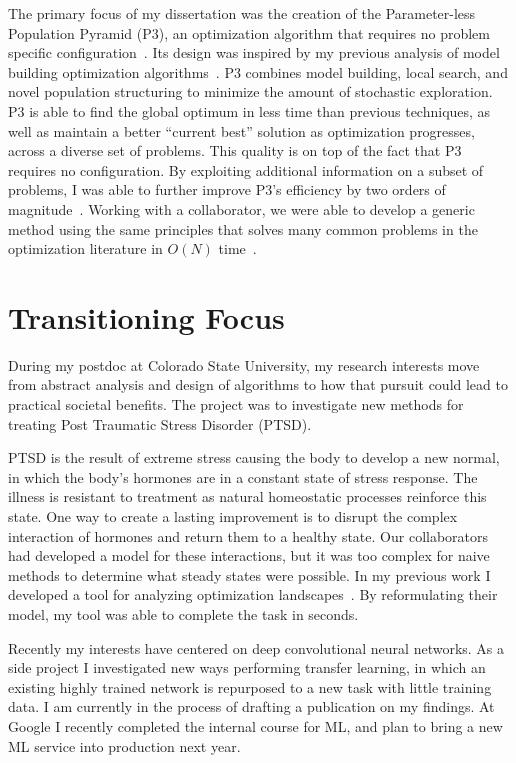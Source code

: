 \documentclass[a4paper, 11pt]{article}
\begin{document}
The primary focus of my dissertation was the creation of the
Parameter-less Population Pyramid (P3), an optimization algorithm
that requires no problem specific configuration~\cite{goldman:2014:p3,goldman:2015:fastp3,goldman:2016:p3hiff}.
Its design was inspired by my previous analysis of model building optimization algorithms~\cite{goldman:2012:ltga}.
P3 combines model building, local search, and novel population structuring to minimize the amount
of stochastic exploration.
P3 is able to find the global optimum in less time than previous techniques, as well as
maintain a better ``current best'' solution as optimization progresses, across a diverse set of problems.
This quality is on top
of the fact that P3 requires no configuration.
By exploiting additional information on a subset of problems, I was able to further
improve P3's efficiency by two orders of magnitude~\cite{goldman:2015:GBO}.
Working with a collaborator, we were able to develop a generic method using the same principles
that solves many common problems in the optimization literature in $O(N)$ time~\cite{whitley:2016:mkl}.

\section{Transitioning Focus}
During my postdoc at Colorado State University, my research interests move from abstract analysis
and design of algorithms to how that pursuit could lead to practical societal benefits.
The project was to investigate new methods for treating Post Traumatic Stress Disorder (PTSD).

PTSD is the result of extreme stress causing the body to develop a new
normal, in which the body's hormones are in a constant state of stress response. The illness is resistant
to treatment as natural homeostatic processes reinforce this state. One way to create a lasting improvement
is to disrupt the complex interaction of hormones and return them to a healthy state. Our collaborators
had developed a model for these interactions, but it was too complex for naive methods to determine what
steady states were possible. In my previous work I developed a tool for analyzing optimization
landscapes~\cite{goldman:2016:hyperplane}. By reformulating their model, my tool was able to complete
the task in seconds.

Recently my interests have centered on deep convolutional neural networks. As a side project I
investigated new ways performing transfer learning, in which an existing highly trained network is
repurposed to a new task with little training data. I am currently in the
process of drafting a publication on my findings. At Google I recently completed the internal course
for ML, and plan to bring a new ML service into production next year.
\end{document}
